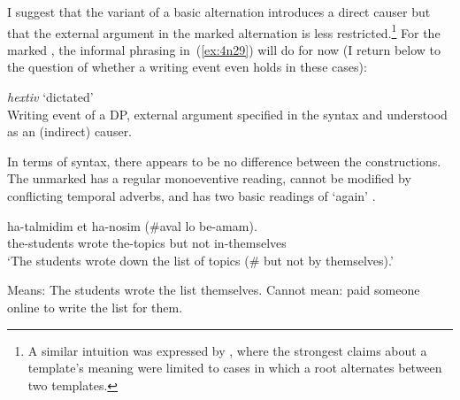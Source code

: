 \begin{exe}
\begin{xlist}
\begin{xlist}
\begin{exe}
\begin{exe}
\begin{xlist}
\begin{exe}
\begin{xlist}
\begin{exe}
\begin{xlist}
\begin{xlist}
\begin{exe}
\begin{xlist}
\begin{exe}
\begin{xlist}
\begin{exe}
\begin{xlist}
\begin{exe}
\begin{exe}
\begin{exe}
\begin{xlist}
\begin{exe}
\begin{exe}
\begin{xlist}
\begin{xlist}
\begin{exe}
\begin{xlist}
\begin{exe}
\begin{exe}
\begin{xlist}
\begin{exe}
\begin{exe}
\begin{xlist}
\begin{exe}
\begin{xlist}
\begin{exe}
\begin{xlist}
\begin{exe}
\begin{xlist}
\begin{exe}
\begin{exe}
\begin{xlist}
I suggest that the  variant of a basic alternation introduces a direct causer \citep{bittner99,kratzer05} but that the external argument in the marked alternation is less restricted.\footnote{A similar intuition was expressed by \cite{doron03}, where the strongest claims about a template's meaning were limited to cases in which a root alternates between two templates.} For the marked , the informal phrasing in~(\ref{ex:4n29}) will do for now (I return below to the question of whether a writing event even holds in these cases):
 \begin{exe}
\ex  \label{ex:4n29}\emph{hextiv} `dictated' \\
	Writing event of a DP, external argument specified in the syntax and understood as an (indirect) causer.
 \z 

In terms of syntax, there appears to be no difference between the constructions. The unmarked  has a regular monoeventive reading, cannot be modified by conflicting temporal adverbs, and has two basic readings of `again' \citep{vonstechow96}.\largerpage[-1]

 \begin{exe}
 \ex    
		\gll ha-talmidim  et ha-nosim (\#aval lo be-a{\ts}mam).\\
 		  the-students wrote  the-topics but not in-themselves\\
 		\glt `The students wrote down the list of topics (\# but not by themselves).' 

		\begin{xlist}
	 	\ex  Means: The students wrote the list themselves. 
 		\ex  Cannot mean: paid someone online to write the list for them. 
 		\z

		

\end{xlist}
\end{exe}
\end{exe}
\end{xlist}
\end{exe}
\end{exe}
\end{xlist}
\end{exe}
\end{xlist}
\end{exe}
\end{xlist}
\end{exe}
\end{xlist}
\end{exe}
\end{exe}
\end{xlist}
\end{exe}
\end{exe}
\end{xlist}
\end{exe}
\end{xlist}
\end{xlist}
\end{exe}
\end{exe}
\end{xlist}
\end{exe}
\end{exe}
\end{exe}
\end{xlist}
\end{exe}
\end{xlist}
\end{exe}
\end{xlist}
\end{exe}
\end{xlist}
\end{xlist}
\end{exe}
\end{xlist}
\end{exe}
\end{xlist}
\end{exe}
\end{exe}
\end{xlist}
\end{xlist}
\end{exe}
